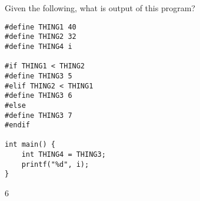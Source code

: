 Given the following, what is output of this program?
\begin{verbatim}
#define THING1 40
#define THING2 32
#define THING4 i

#if THING1 < THING2
#define THING3 5
#elif THING2 < THING1
#define THING3 6
#else
#define THING3 7
#endif

int main() {
    int THING4 = THING3;
    printf("%d", i);
}
\end{verbatim}
\begin{answer}
6
\end{answer}
